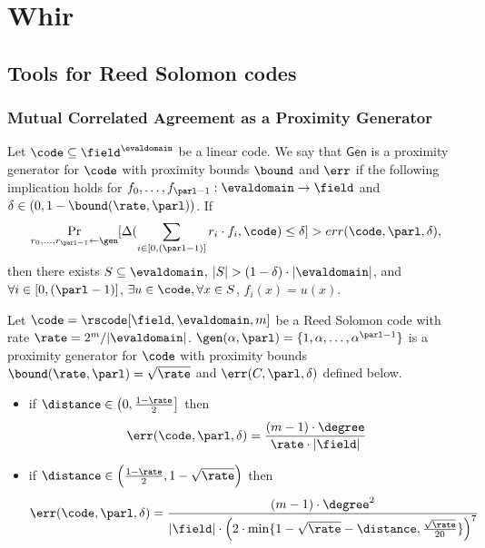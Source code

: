 
\section{Whir}

\subsection{Tools for Reed Solomon codes}

\subsubsection{Mutual Correlated Agreement as a Proximity Generator}

\begin{definition}\label{def:proximity_generator}
Let $\code\subseteq \field^{\evaldomain}$ be a linear code. We say that $\mathsf{Gen}$ is a proximity generator for $\code$ with proximity bounds ${\bound}$ and $\err$ if the following implication holds for $f_0,\ldots,f_{\parl-1} : \evaldomain \rightarrow \field$ and $\delta\in(0,1-{\bound}(\rate,\parl))$. If
\begin{align*}
    \Pr_{r_0,\ldots,r_{\parl-1}\leftarrow \gen}[\Delta(\sum_{i\in[0,(\parl-1)]} r_i \cdot f_i, \code) \le \delta] > err(\code,\parl,\delta),
\end{align*}
then there exists $S\subseteq \evaldomain$, $|S|>(1-\delta)\cdot|\evaldomain|$, and
$\forall i \in [0, (\parl-1)]$, $\exists u \in \code, \forall x \in S$, $f_i(x)=u(x)$. 
\end{definition}

\begin{theorem}\label{thm:proximity_gap_whir}
    Let $\code = \rscode[\field,\evaldomain,m]$ be a Reed Solomon code with rate $\rate = 2^m/|\evaldomain|$. $\gen(\alpha,\parl)=\{1,\alpha,\ldots,\alpha^{\parl-1}\}$ is a proximity generator for $\code$ with proximity bounds ${\bound}(\rate,\parl)=\sqrt{\rate}$ and $\err(C,\parl,\delta)$ defined below.
    \begin{itemize}
        \item if $\distance \in \left(0,\frac{1-\rate}{2}\right]$ then
            \[
                \err(\code,\parl,\delta)=\frac{(m-1)\cdot \degree}{\rate\cdot|\field|}
            \]
        \item if $\distance \in \Bigl(\frac{1-\rate}{2}, 1-\sqrt{\rate}\Bigr)$ then
        \[
            \err(\code,\parl,\delta)=\frac{(m-1)\cdot {\degree}^2}{|\field|\cdot{\Bigl(2\cdot\min\{1-\sqrt{\rate}-\distance,\frac{\sqrt{\rate}}{20}\}\Bigr)}^7}
        \]
    \end{itemize}
\end{theorem}

